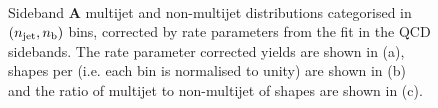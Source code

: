 \clearpage

\begin{figure}[!h]
  \centering
   \\
  \caption{Sideband \textbf{A} multijet and non-multijet distributions
    categorised in $(n_{\text{jet}}, n_{\text{b}})$ bins, corrected by rate parameters
    from the fit in the QCD sidebands. The rate parameter corrected yields
    are shown in (a), \nb shapes per \njet (i.e. each \njet bin is normalised
    to unity) are shown in (b) and the ratio of multijet to non-multijet of
    \nb shapes are shown in (c).}
  \label{fig:qcd_nb_shapes_doublesb}
\end{figure}

